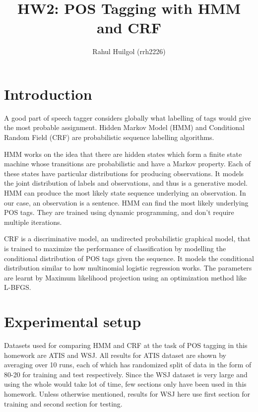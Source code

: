 \documentclass[twocolumn]{article}
\begin{document}
\title{\vspace{-4ex}HW2: POS Tagging with HMM and CRF}
\author{Rahul Huilgol (rrh2226)}
\date{}
\maketitle
\vspace{-5mm}
\section{Introduction}
A good part of speech tagger considers globally what labelling of tags would give the most probable assignment. Hidden Markov Model (HMM) and Conditional Random Field (CRF) are probabilistic sequence labelling algorithms. 

HMM works on the idea that there are hidden states which form a finite state machine whose transitions are probabilistic and have a Markov property. Each of these states have particular distributions for producing observations. It models the joint distribution of labels and observations, and thus is a generative model. HMM can produce the most likely state sequence underlying an observation. In our case, an observation is a sentence. HMM can find the most likely underlying POS tags. They are trained using dynamic programming, and don't require multiple iterations.

CRF is a discriminative model, an undirected probabilistic graphical model, that is trained to maximize the performance of classification by modelling the conditional distribution of POS tags given the sequence. It models the conditional distribution similar to how multinomial logistic regression works. The parameters are learnt by Maximum likelihood projection using an optimization method like L-BFGS. 
\section{Experimental setup}
Datasets used for comparing  HMM and CRF at the task of POS tagging in this homework are ATIS and WSJ. All results for ATIS dataset are shown by averaging over 10 runs, each of which has randomized split of data in the form of 80-20 for training and test respectively. Since the WSJ dataset is very large and using the whole would take lot of time, few sections only have been used in this homework. Unless otherwise mentioned, results for WSJ here use first section for training and second section for testing.
\end{document}
